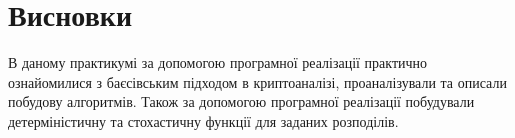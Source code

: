 \section{Висновки}

В даному практикумі за допомогою програмної реалізації практично ознайомилися з баєсівським підходом в криптоаналізі, проаналізували та описали побудову алгоритмів. Також за допомогою програмної реалізації побудували детерміністичну та стохастичну функції для заданих розподілів.